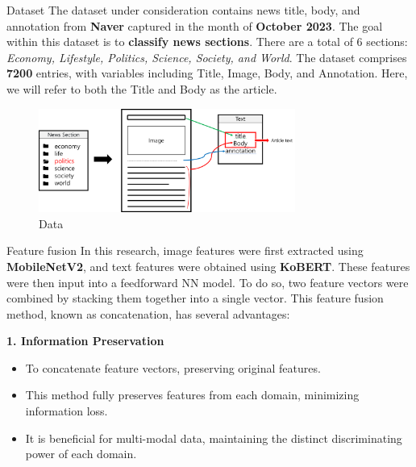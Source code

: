 \documentclass[final]{beamer}
\newlength{\colwidth}
\begin{document}
\begin{frame}[t]
\begin{columns}[t]
\begin{column}{\colwidth}
    \begin{block}{Dataset}
        \setlength{\parindent}{1em}The dataset under consideration contains news title, body, and annotation from \textbf{Naver} captured in the month of \textbf{October 2023}. The goal within this dataset is to \textbf{classify news sections}. There are a total of 6 sections: \textit{Economy, Lifestyle, Politics, Science, Society, and World}. The dataset comprises \textbf{7200} entries, with variables including Title, Image, Body, and Annotation. Here, we will refer to both the Title and Body as the article.
    
        \begin{figure}[ht]
        \centering
        \hspace{2.7cm}\includegraphics[width=0.75\textwidth]{Figure/fig-dataset.png}
        \caption{Data}
        \label{fig:data}
        \end{figure}
    
    \end{block}



    \begin{block}{Feature fusion}
    \hspace{1em}In this research, image features were first extracted using \textbf{MobileNetV2}, and text features were obtained using \textbf{KoBERT}. These features were then input into a feedforward NN model. To do so, two feature vectors were combined by stacking them together into a single vector.
    This feature fusion method, known as concatenation, has several advantages:\\

    \vspace{10pt}

    \textbf{1. Information Preservation}\\
    \begin{itemize}
    \item To concatenate feature vectors, preserving original features.
    \item This method fully preserves features from each domain, minimizing information loss.
    \item It is beneficial for multi-modal data, maintaining the distinct discriminating power of each domain.
    \end{itemize}
    \\
    

\end{block}
\end{column}
\end{columns}
\end{frame}
\end{document}
